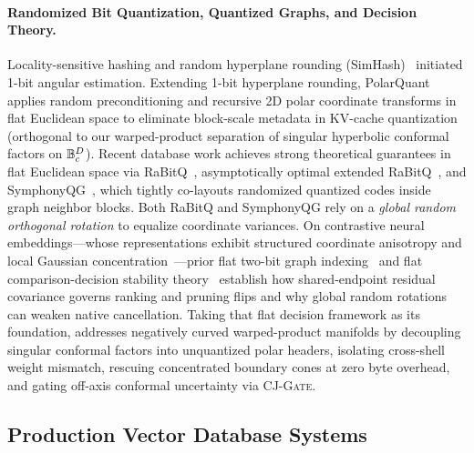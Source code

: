\paragraph{Randomized Bit Quantization, Quantized Graphs, and Decision Theory.}
Locality-sensitive hashing and random hyperplane rounding ({SimHash})~\cite{indyk1998approximate,charikar2002similarity} initiated 1-bit angular estimation.
Extending 1-bit hyperplane rounding, {PolarQuant}~\cite{han2026polarquant} applies random preconditioning and recursive 2D polar coordinate transforms in flat {Euclidean} space to eliminate block-scale metadata in {KV}-cache quantization (orthogonal to our warped-product separation of singular hyperbolic conformal factors on $\mathbb{B}_c^D$).
Recent database work achieves strong theoretical guarantees in flat Euclidean space via {RaBitQ}~\cite{gao2024rabitq}, asymptotically optimal extended {RaBitQ}~\cite{gao2025extendedrabitq}, and {SymphonyQG}~\cite{gou2025symphonyqg}, which tightly co-layouts randomized quantized codes inside graph neighbor blocks.
Both {RaBitQ} and {SymphonyQG} rely on a \emph{global random orthogonal rotation} to equalize coordinate variances.
On contrastive neural embeddings---whose representations exhibit structured coordinate anisotropy and local Gaussian concentration~\cite{wang2020understanding,betser2026infonce}---prior flat two-bit graph indexing~\cite{xiao2026quiver} and flat comparison-decision stability theory~\cite{xiao2026decisions} establish how shared-endpoint residual covariance governs ranking and pruning flips and why global random rotations can weaken native cancellation.
Taking that flat decision framework as its foundation, \rquiver{} addresses negatively curved warped-product manifolds by decoupling singular conformal factors into unquantized polar headers, isolating cross-shell weight mismatch, rescuing concentrated boundary cones at zero byte overhead, and gating off-axis conformal uncertainty via \textsc{CJ-Gate}.

\subsection{Production Vector Database Systems}
\label{subsec:rel_systems}


